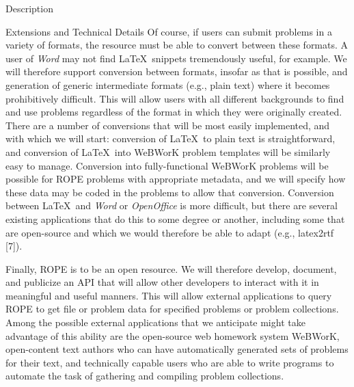 \documentclass[11pt]{article}
\begin{document}
\begin{section}{Description}
\begin{subsection}{Extensions and Technical Details}
Of course, if users can submit problems in a variety of formats, the resource 
must be able to convert between these formats.
A user of
\emph{Word} may not find \LaTeX\ snippets tremendously useful, for
example.  We will therefore support conversion between formats, insofar as
that is possible, and generation of generic intermediate formats (e.g.,
plain text) where it becomes prohibitively difficult.  This will allow
users with all different backgrounds to find and use problems regardless
of the format in which they were originally created.  There are a number
of conversions that will be most easily implemented, and with which we
will start: conversion of \LaTeX\ to plain text is straightforward, and
conversion of \LaTeX\ into WeBWorK problem templates will be similarly
easy to manage.  Conversion into fully-functional WeBWorK problems will
be possible for ROPE problems with appropriate metadata, and we will
specify how these data may be coded in the problems to allow that
conversion.  Conversion between \LaTeX\ and \emph{Word} or
\emph{OpenOffice} is more difficult, but there are several existing
applications that do this to some degree or another, including some that
are open-source and which we would therefore be able to adapt (e.g.,
latex2rtf [7]).  

Finally, ROPE is to be an open resource.  We will therefore develop,
document, and publicize an API that will allow other developers to interact
with it in meaningful and useful manners.  This will allow external
applications to query ROPE to get file or problem data for specified
problems or problem collections.  Among the possible external applications
that we anticipate might take advantage of this ability are
the open-source web homework system WeBWorK, open-content text authors who
can have automatically generated sets of problems for their text, and
technically capable users who are able to write programs to automate the
task of gathering and compiling problem collections.

\end{subsection}

\end{section}
\end{document}
